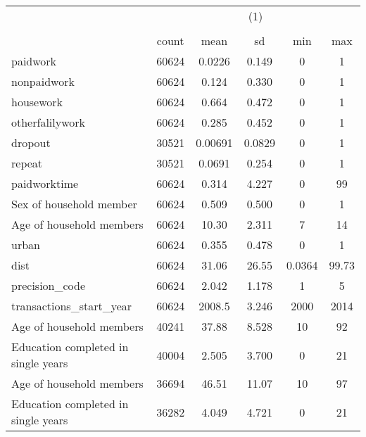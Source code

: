 {
\def\sym#1{\ifmmode^{#1}\else\(^{#1}\)\fi}
\begin{tabular}{l*{1}{ccccc}}
\toprule
                    &\multicolumn{5}{c}{(1)}                                         \\
                    &\multicolumn{5}{c}{}                                            \\
                    &       count&        mean&          sd&         min&         max\\
\midrule
paidwork            &       60624&      0.0226&       0.149&           0&           1\\
nonpaidwork         &       60624&       0.124&       0.330&           0&           1\\
housework           &       60624&       0.664&       0.472&           0&           1\\
otherfalilywork     &       60624&       0.285&       0.452&           0&           1\\
dropout             &       30521&     0.00691&      0.0829&           0&           1\\
repeat              &       30521&      0.0691&       0.254&           0&           1\\
paidworktime        &       60624&       0.314&       4.227&           0&          99\\
Sex of household member&       60624&       0.509&       0.500&           0&           1\\
Age of household members&       60624&       10.30&       2.311&           7&          14\\
urban               &       60624&       0.355&       0.478&           0&           1\\
dist                &       60624&       31.06&       26.55&      0.0364&       99.73\\
precision\_code      &       60624&       2.042&       1.178&           1&           5\\
transactions\_start\_year&       60624&      2008.5&       3.246&        2000&        2014\\
Age of household members&       40241&       37.88&       8.528&          10&          92\\
Education completed in single years&       40004&       2.505&       3.700&           0&          21\\
Age of household members&       36694&       46.51&       11.07&          10&          97\\
Education completed in single years&       36282&       4.049&       4.721&           0&          21\\
\bottomrule
\end{tabular}
}
